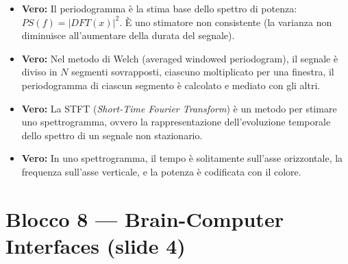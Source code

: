 \begin{itemize}
    \item \textbf{Vero:} Il periodogramma è la stima base dello spettro di potenza: $PS(f) = |DFT(x)|^2$. È uno stimatore non consistente (la varianza non diminuisce all'aumentare della durata del segnale).
    
    \item \textbf{Vero:} Nel metodo di Welch (averaged windowed periodogram), il segnale è diviso in $N$ segmenti sovrapposti, ciascuno moltiplicato per una finestra, il periodogramma di ciascun segmento è calcolato e mediato con gli altri.
    
    \item \textbf{Vero:} La STFT (\textit{Short-Time Fourier Transform}) è un metodo per stimare uno spettrogramma, ovvero la rappresentazione dell'evoluzione temporale dello spettro di un segnale non stazionario.
    
    \item \textbf{Vero:} In uno spettrogramma, il tempo è solitamente sull'asse orizzontale, la frequenza sull'asse verticale, e la potenza è codificata con il colore.
\end{itemize}

\section{Blocco 8 — Brain-Computer Interfaces (slide 4)}

